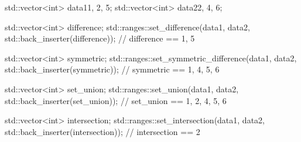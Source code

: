 \begin{box-note}
\begin{cppcode}
std::vector<int> data1{1, 2, 5};
std::vector<int> data2{2, 4, 6};

std::vector<int> difference;
std::ranges::set_difference(data1, data2, std::back_inserter(difference));
// difference == {1, 5}

std::vector<int> symmetric;
std::ranges::set_symmetric_difference(data1, data2, std::back_inserter(symmetric));
// symmetric == {1, 4, 5, 6}

std::vector<int> set_union;
std::ranges::set_union(data1, data2, std::back_inserter(set_union));
// set_union == {1, 2, 4, 5, 6}

std::vector<int> intersection;
std::ranges::set_intersection(data1, data2, std::back_inserter(intersection));
// intersection == {2}
\end{cppcode}
\end{box-note}